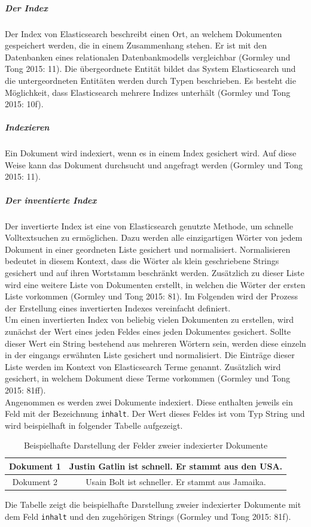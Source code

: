 \documentclass[a4paper]{scrartcl}
\begin{document}
\subparagraph{Der Index}
Der Index von Elasticsearch beschreibt einen Ort, an welchem Dokumenten gespeichert werden, die in einem Zusammenhang stehen. Er ist mit den Datenbanken eines relationalen Datenbankmodells vergleichbar (Gormley und Tong 2015: 11). Die übergeordnete Entität bildet das System Elasticsearch und die untergeordneten Entitäten werden durch Typen beschrieben. Es besteht die Möglichkeit, dass Elasticsearch mehrere Indizes unterhält (Gormley und Tong 2015: 10f).

\subparagraph{Indexieren}
Ein Dokument wird indexiert, wenn es in einem Index gesichert wird. Auf diese Weise kann das Dokument durchsucht und angefragt werden (Gormley und Tong 2015: 11).

\subparagraph{Der inventierte Index}
Der invertierte Index ist eine von Elasticsearch genutzte Methode, um schnelle Volltextsuchen zu ermöglichen. Dazu werden alle einzigartigen Wörter von jedem Dokument in einer geordneten Liste gesichert und normalisiert. Normalisieren bedeutet in diesem Kontext, dass die Wörter als klein geschriebene Strings gesichert und auf ihren Wortstamm beschränkt werden. Zusätzlich zu dieser Liste wird eine weitere Liste von Dokumenten erstellt, in welchen die Wörter der ersten Liste vorkommen (Gormley und Tong 2015: 81). Im Folgenden wird der Prozess der Erstellung eines invertierten Indexes vereinfacht definiert. \\
Um einen invertierten Index von beliebig vielen Dokumenten zu erstellen, wird zunächst der Wert eines jeden Feldes eines jeden Dokumentes gesichert. Sollte dieser Wert ein String bestehend aus mehreren Wörtern sein, werden diese einzeln in der eingangs erwähnten Liste gesichert und normalisiert. Die Einträge dieser Liste werden im Kontext von Elasticsearch Terme genannt. Zusätzlich wird gesichert, in welchem Dokument diese Terme vorkommen (Gormley und Tong 2015: 81ff). \\
Angenommen es werden zwei Dokumente indexiert. Diese enthalten jeweils ein Feld mit der Bezeichnung \texttt{inhalt}. Der Wert dieses Feldes ist vom Typ String und wird beispielhaft in folgender Tabelle aufgezeigt. 

\begin{table}[htb]
	\centering
	\caption{Beispielhafte Darstellung der Felder zweier indexierter Dokumente}
	\begin{center}
		
		\begin{tabular}{| c | c |}
			\hline
			Dokument 1 & Justin Gatlin ist schnell. Er stammt aus den USA. \\ [0.5ex]
			\hline \hline
			Dokument 2 & Usain Bolt ist schneller. Er stammt aus Jamaika. \\
			\hline
		\end{tabular}
	\end{center}
	Die Tabelle zeigt die beispielhafte Darstellung zweier indexierter Dokumente mit dem Feld \texttt{inhalt} und den zugehörigen Strings (Gormley und Tong 2015: 81f).
\end{table}
\end{document}
